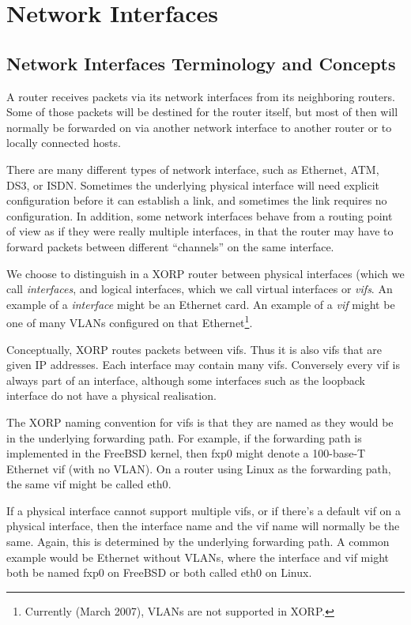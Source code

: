 %
%

\chapter{Network Interfaces}
\label{interfaces}
\section{Network Interfaces Terminology and Concepts}

A router receives packets via its network interfaces from its
neighboring routers.  Some of those packets will be destined for the
router itself, but most of then will normally be forwarded on via
another network interface to another router or to locally connected
hosts.

There are many different types of network interface, such as Ethernet,
ATM, DS3, or ISDN.  Sometimes the underlying physical interface will
need explicit configuration before it can establish a link, and
sometimes the link requires no configuration.  In addition, some
network interfaces behave from a routing point of view as if they were
really multiple interfaces, in that the router may have to forward
packets between different ``channels'' on the same interface.  

We choose to distinguish in a XORP router between physical interfaces
(which we call {\it interfaces}, and logical interfaces, which we call
virtual interfaces or {\it vifs}.  An example of a {\it interface}
might be an Ethernet card.  An example of a {\it vif} might be one of
many VLANs configured on that Ethernet\footnote{Currently (March 2007),
VLANs are not supported in XORP.}.

Conceptually, XORP routes packets between vifs.  Thus it is also vifs
that are given IP addresses.  Each interface may contain many vifs.
Conversely every vif is always part of an interface, although some
interfaces such as the loopback interface do not have a physical
realisation.

The XORP naming convention for vifs is that they are named as they
would be in the underlying forwarding path.  For example, if the
forwarding path is implemented in the FreeBSD kernel, then {\stt fxp0}
might denote a 100-base-T Ethernet vif (with no VLAN).  On a router
using Linux as the forwarding path, the same vif might be called {\stt
eth0}.  

If a physical interface cannot support multiple vifs, or if there's a
default vif on a physical interface, then the interface name and the
vif name will normally be the same.  Again, this is determined by the
underlying forwarding path.  A common example would be Ethernet
without VLANs, where the interface and vif might both be named {\stt
fxp0} on FreeBSD or both called {\stt eth0} on Linux.

